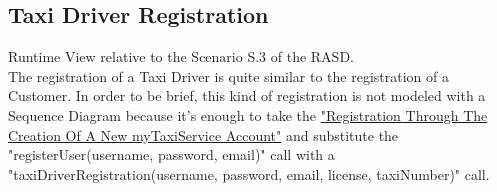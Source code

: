 \documentclass[../../../../../../dd.tex]{subfiles}
\begin{document}
	\subsection{Taxi Driver Registration}
		Runtime View relative to the Scenario S.3 of the RASD.\\
		The registration of a Taxi Driver is quite similar to the registration of a Customer.
		In order to be brief, this kind of registration is not modeled with a Sequence Diagram because it's enough to take the \hyperref[subsec:RegistrationNewAccount]{"Registration Through The Creation Of A New myTaxiService Account"} and substitute the "registerUser(username, password, email)" call with a "taxiDriverRegistration(username, password, email, license, taxiNumber)" call.
		
\end{document}
